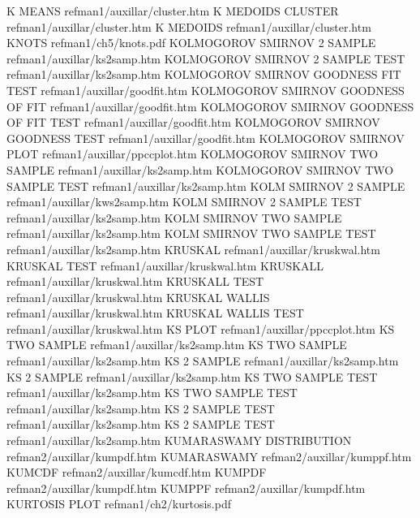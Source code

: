 K MEANS                                 refman1/auxillar/cluster.htm
K MEDOIDS CLUSTER                       refman1/auxillar/cluster.htm
K MEDOIDS                               refman1/auxillar/cluster.htm
KNOTS                                   refman1/ch5/knots.pdf
KOLMOGOROV SMIRNOV 2 SAMPLE             refman1/auxillar/ks2samp.htm
KOLMOGOROV SMIRNOV 2 SAMPLE TEST        refman1/auxillar/ks2samp.htm
KOLMOGOROV SMIRNOV GOODNESS FIT TEST    refman1/auxillar/goodfit.htm
KOLMOGOROV SMIRNOV GOODNESS OF FIT      refman1/auxillar/goodfit.htm
KOLMOGOROV SMIRNOV GOODNESS OF FIT TEST refman1/auxillar/goodfit.htm
KOLMOGOROV SMIRNOV GOODNESS TEST        refman1/auxillar/goodfit.htm
KOLMOGOROV SMIRNOV PLOT                 refman1/auxillar/ppccplot.htm
KOLMOGOROV SMIRNOV TWO SAMPLE           refman1/auxillar/ks2samp.htm
KOLMOGOROV SMIRNOV TWO SAMPLE TEST      refman1/auxillar/ks2samp.htm
KOLM SMIRNOV 2 SAMPLE                   refman1/auxillar/kws2samp.htm
KOLM SMIRNOV 2 SAMPLE TEST              refman1/auxillar/ks2samp.htm
KOLM SMIRNOV TWO SAMPLE                 refman1/auxillar/ks2samp.htm
KOLM SMIRNOV TWO SAMPLE TEST            refman1/auxillar/ks2samp.htm
KRUSKAL                                 refman1/auxillar/kruskwal.htm
KRUSKAL TEST                            refman1/auxillar/kruskwal.htm
KRUSKALL                                refman1/auxillar/kruskwal.htm
KRUSKALL TEST                           refman1/auxillar/kruskwal.htm
KRUSKAL WALLIS                          refman1/auxillar/kruskwal.htm
KRUSKAL WALLIS TEST                     refman1/auxillar/kruskwal.htm
KS PLOT                                 refman1/auxillar/ppccplot.htm
KS TWO SAMPLE                           refman1/auxillar/ks2samp.htm
KS TWO SAMPLE                           refman1/auxillar/ks2samp.htm
KS 2 SAMPLE                             refman1/auxillar/ks2samp.htm
KS 2 SAMPLE                             refman1/auxillar/ks2samp.htm
KS TWO SAMPLE TEST                      refman1/auxillar/ks2samp.htm
KS TWO SAMPLE TEST                      refman1/auxillar/ks2samp.htm
KS 2 SAMPLE TEST                        refman1/auxillar/ks2samp.htm
KS 2 SAMPLE TEST                        refman1/auxillar/ks2samp.htm
KUMARASWAMY DISTRIBUTION                refman2/auxillar/kumpdf.htm
KUMARASWAMY                             refman2/auxillar/kumppf.htm
KUMCDF                                  refman2/auxillar/kumcdf.htm
KUMPDF                                  refman2/auxillar/kumpdf.htm
KUMPPF                                  refman2/auxillar/kumpdf.htm
KURTOSIS PLOT                           refman1/ch2/kurtosis.pdf
